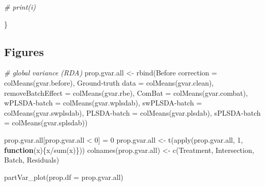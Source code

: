 \documentclass[
]{book}
\newenvironment{Shaded}{\begin{snugshade}}{\end{snugshade}}
\newcommand{\AttributeTok}[1]{\textcolor[rgb]{0.77,0.63,0.00}{#1}}
\newcommand{\CommentTok}[1]{\textcolor[rgb]{0.56,0.35,0.01}{\textit{#1}}}
\newcommand{\ControlFlowTok}[1]{\textcolor[rgb]{0.13,0.29,0.53}{\textbf{#1}}}
\newcommand{\DecValTok}[1]{\textcolor[rgb]{0.00,0.00,0.81}{#1}}
\newcommand{\FunctionTok}[1]{\textcolor[rgb]{0.00,0.00,0.00}{#1}}
\newcommand{\NormalTok}[1]{#1}
\newcommand{\OtherTok}[1]{\textcolor[rgb]{0.56,0.35,0.01}{#1}}
\newcommand{\SpecialCharTok}[1]{\textcolor[rgb]{0.00,0.00,0.00}{#1}}
\newcommand{\StringTok}[1]{\textcolor[rgb]{0.31,0.60,0.02}{#1}}
\begin{document}
\begin{Shaded}
\begin{Highlighting}[]
  \CommentTok{\#  print(i)}
  
\NormalTok{\}}
\end{Highlighting}
\end{Shaded}

\hypertarget{figures-5}{%
\subsection{Figures}\label{figures-5}}

\begin{Shaded}
\begin{Highlighting}[]
\CommentTok{\# global variance (RDA)}
\NormalTok{prop.gvar.all }\OtherTok{\textless{}{-}} \FunctionTok{rbind}\NormalTok{(}\StringTok{\textasciigrave{}}\AttributeTok{Before correction}\StringTok{\textasciigrave{}} \OtherTok{=} \FunctionTok{colMeans}\NormalTok{(gvar.before),}
                       \StringTok{\textasciigrave{}}\AttributeTok{Ground{-}truth data}\StringTok{\textasciigrave{}} \OtherTok{=} \FunctionTok{colMeans}\NormalTok{(gvar.clean),}
                       \AttributeTok{removeBatchEffect =} \FunctionTok{colMeans}\NormalTok{(gvar.rbe),}
                       \AttributeTok{ComBat =} \FunctionTok{colMeans}\NormalTok{(gvar.combat),}
                       \StringTok{\textasciigrave{}}\AttributeTok{wPLSDA{-}batch}\StringTok{\textasciigrave{}} \OtherTok{=} \FunctionTok{colMeans}\NormalTok{(gvar.wplsdab),}
                       \StringTok{\textasciigrave{}}\AttributeTok{swPLSDA{-}batch}\StringTok{\textasciigrave{}} \OtherTok{=} \FunctionTok{colMeans}\NormalTok{(gvar.swplsdab),}
                       \StringTok{\textasciigrave{}}\AttributeTok{PLSDA{-}batch}\StringTok{\textasciigrave{}} \OtherTok{=} \FunctionTok{colMeans}\NormalTok{(gvar.plsdab),}
                       \StringTok{\textasciigrave{}}\AttributeTok{sPLSDA{-}batch}\StringTok{\textasciigrave{}} \OtherTok{=} \FunctionTok{colMeans}\NormalTok{(gvar.splsdab))}

\NormalTok{prop.gvar.all[prop.gvar.all }\SpecialCharTok{\textless{}} \DecValTok{0}\NormalTok{] }\OtherTok{=} \DecValTok{0}
\NormalTok{prop.gvar.all }\OtherTok{\textless{}{-}} \FunctionTok{t}\NormalTok{(}\FunctionTok{apply}\NormalTok{(prop.gvar.all, }\DecValTok{1}\NormalTok{, }\ControlFlowTok{function}\NormalTok{(x)\{x}\SpecialCharTok{/}\FunctionTok{sum}\NormalTok{(x)\}))}
\FunctionTok{colnames}\NormalTok{(prop.gvar.all) }\OtherTok{\textless{}{-}} \FunctionTok{c}\NormalTok{(}\StringTok{\textquotesingle{}Treatment\textquotesingle{}}\NormalTok{, }\StringTok{\textquotesingle{}Intersection\textquotesingle{}}\NormalTok{, }\StringTok{\textquotesingle{}Batch\textquotesingle{}}\NormalTok{, }\StringTok{\textquotesingle{}Residuals\textquotesingle{}}\NormalTok{)}

\FunctionTok{partVar\_plot}\NormalTok{(}\AttributeTok{prop.df =}\NormalTok{ prop.gvar.all)}
\end{Highlighting}
\end{Shaded}
\end{document}
